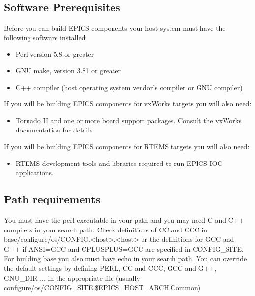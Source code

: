 \subsection{Software Prerequisites}

Before you can build EPICS components your host system must have the following software installed: 

\begin{itemize}\item {}Perl version 5.8 or greater

\item {}GNU make, version 3.81 or greater

\item C++ compiler (host operating system vendor's compiler or GNU compiler)

\end{itemize}If you will be building EPICS components for vxWorks targets you will also need:

\begin{itemize}\item {}Tornado II and one or more board support packages. Consult the vxWorks documentation for details.

\end{itemize}If you will be building EPICS components for RTEMS targets you will also need:

\begin{itemize}\item {}RTEMS development tools and libraries required to run EPICS IOC applications.

\end{itemize}\subsection{Path requirements}

You must have the perl executable in your path and you may need C and C++ compilers in your search path. Check 
definitions of CC and CCC in base/configure/os/CONFIG.\textless{}host\textgreater{}.\textless{}host\textgreater{} or the definitions for GCC and G++ if 
ANSI=GCC and CPLUSPLUS=GCC are specified in CONFIG\_SITE. For building base you also must have echo in your 
search path. You can override the default settings by defining PERL, CC and CCC, GCC and G++, GNU\_DIR ... in the 
appropriate file (usually configure/os/CONFIG\_SITE.\$EPICS\_HOST\_ARCH.Common)

